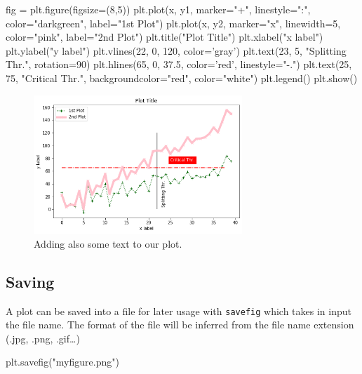 \begin{ipython}
\begin{ipython}
fig = plt.figure(figsize=(8,5))
plt.plot(x, y1, marker="+", linestyle=":", color="darkgreen", label="1st Plot")
plt.plot(x, y2, marker="x", linewidth=5, color="pink", label="2nd Plot")
plt.title("Plot Title")
plt.xlabel("x label")
plt.ylabel("y label")
plt.vlines(22, 0, 120, color='gray')
plt.text(23, 5, "Splitting Thr.", rotation=90)
plt.hlines(65, 0, 37.5, color='red', linestyle="-.")
plt.text(25, 75, "Critical Thr.", backgroundcolor="red", color="white")
plt.legend()
plt.show()
\end{ipython}

\begin{figure}[htb]
	\centering
	\includegraphics[width=0.7\textwidth]{figures/text}
	\caption{Adding also some text to our plot.}
	\label{fig:text}
\end{figure}

\subsection{Saving}\label{saving}

A plot can be saved into a file for later usage with \texttt{savefig} which takes in input the file name. The format of the file will be inferred from the file name extension (.jpg, .png, .gif\ldots)

\begin{ipython}
plt.savefig("myfigure.png")
\end{ipython}


\end{ipython}
